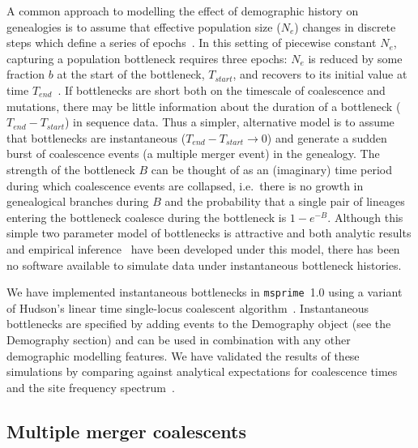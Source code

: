 \documentclass{article}
\newcommand{\msprime}[0]{\texttt{msprime}}
\begin{document}
A common approach to modelling the effect of demographic history on genealogies
is to assume that effective population size ($N_e$) changes in discrete steps
which define a series of epochs~\citep{griffiths1994sampling, marth2004allele,
keightley2007joint,li2011inference}. In this setting of piecewise constant
$N_e$, capturing a population bottleneck requires three epochs: $N_e$ is
reduced by some fraction $b$ at the start of the bottleneck, $T_{start}$, and
recovers to its initial value at time $T_{end}$~\citep{marth2004allele}. If
bottlenecks are short both on the timescale of coalescence and mutations,
there may be little information about the duration of a bottleneck
($T_{end}-T_{start}$) in sequence data. Thus a simpler, alternative model is to
assume that bottlenecks are instantaneous ($T_{end}-T_{start} \rightarrow 0$)
and generate a sudden burst of coalescence events (a multiple merger event) in
the genealogy. The strength of the bottleneck $B$ can be thought of as an
(imaginary) time period during which coalescence events are collapsed,
i.e.\ there is no growth in genealogical branches during $B$ and the probability that a
single pair of lineages entering the bottleneck coalesce during the bottleneck
is $1-e^{-B}$. Although this simple two parameter model of bottlenecks is
attractive and both analytic results and empirical
inference~\citep{griffiths1994sampling, galtier2000detecting,
bunnefeld2015inferring} have been developed under this model, there has
been no software available to simulate data under instantaneous
bottleneck histories.

We have implemented instantaneous bottlenecks in \msprime~1.0
using a variant of Hudson's linear time single-locus coalescent
algorithm~\citep{hudson1990gene}. Instantaneous bottlenecks are specified
by adding events to the Demography object (see the Demography section)
and can be used in combination with any other demographic modelling
features. We have validated the results of these simulations by comparing
against analytical expectations for coalescence times and the
site frequency spectrum~\citep{bunnefeld2015inferring}.

\subsection*{Multiple merger coalescents}
\end{document}
